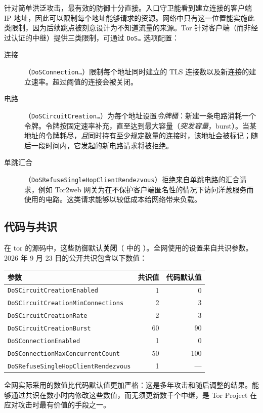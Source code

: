 针对简单洪泛攻击，最有效的防御十分直接。入口守卫能看到建立连接的客户端 IP 地址，因此可以限制每个地址能够请求的资源。网络中只有这一位置能实施此类限制，因为后续跳点被刻意设计为不知道流量的来源。Tor 针对客户端（而非经过认证的中继）提供三类限制，可通过 \texttt{DoS\ldots} 选项配置：
\begin{description}
  \item[连接]（\texttt{DoSConnection\ldots}）限制每个地址同时建立的 TLS 连接数以及新连接的建立速率。超过阈值的连接会被关闭。
  \item[电路]（\texttt{DoSCircuitCreation\ldots}）为每个地址设置\emph{令牌桶}：新建一条电路消耗一个令牌。令牌按固定速率补充，直至达到最大容量（\emph{突发容量}，burst）。当某地址的令牌耗尽，\emph{且}同时持有至少规定数量的连接时，该地址会被标记；随后一段时间内，它发起的新电路请求将被拒绝。
  \item[单跳汇合]（\texttt{DoSRefuseSingleHopClientRendezvous}）拒绝来自单跳电路的汇合请求，例如 Tor2web 网关为在不保护客户端匿名性的情况下访问洋葱服务而使用的电路。这类请求能够以较低成本给网络带来负载。
\end{description}

\subsection{代码与共识}

在 tor 的源码中，这些防御默认\textbf{关闭}（ 中的 ）。全网使用的设置来自共识参数。2026 年 9 月 23 日的公开共识包含以下数值：
\begin{center}\small
\begin{tabular}{lrr}
\toprule
参数 & 共识值 & 代码默认值 \\
\midrule
\texttt{DoSCircuitCreationEnabled} & 1 & 0 \\
\texttt{DoSCircuitCreationMinConnections} & 2 & 3 \\
\texttt{DoSCircuitCreationRate} & 2 & 3 \\
\texttt{DoSCircuitCreationBurst} & 60 & 90 \\
\texttt{DoSConnectionEnabled} & 1 & 0 \\
\texttt{DoSConnectionMaxConcurrentCount} & 50 & 100 \\
\texttt{DoSRefuseSingleHopClientRendezvous} & 1 & --- \\
\bottomrule
\end{tabular}
\end{center}
全网实际采用的数值比代码默认值更加严格：这是多年攻击和随后调整的结果。能够通过共识在数小时内修改这些数值，而无须更新数千个中继，是 Tor Project 在应对攻击时最有价值的手段之一。

